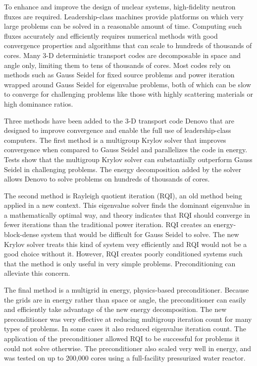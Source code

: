
\noindent       %
To enhance and improve the design of nuclear systems, high-fidelity neutron fluxes are required. Leadership-class machines provide platforms on which very large problems can be solved in a reasonable amount of time. Computing such fluxes accurately and efficiently requires numerical methods with good convergence properties and algorithms that can scale to hundreds of thousands of cores. Many 3-D deterministic transport codes are decomposable in space and angle only, limiting them to tens of thousands of cores. Most codes rely on methods such as Gauss Seidel for fixed source problems and power iteration wrapped around Gauss Seidel for eigenvalue problems, both of which can be slow to converge for challenging problems like those with highly scattering materials or high dominance ratios. 

\vspace*{0.5em}
\noindent       %
Three methods have been added to the 3-D \Sn transport code Denovo that are designed to improve convergence and enable the full use of leadership-class computers. The first method is a multigroup Krylov solver that improves convergence when compared to Gauss Seidel and parallelizes the code in energy. Tests show that the multigroup Krylov solver can substantially outperform Gauss Seidel in challenging problems. The energy decomposition added by the solver allows Denovo to solve problems on hundreds of thousands of cores. 

\vspace*{0.5em}
\noindent       %
The second method is Rayleigh quotient iteration (RQI), an old method being applied in a new context. This eigenvalue solver finds the dominant eigenvalue in a mathematically optimal way, and theory indicates that RQI should converge in fewer iterations than the traditional power iteration. RQI creates an energy-block-dense system that would be difficult for Gauss Seidel to solve. The new Krylov solver treats this kind of system very efficiently and RQI would not be a good choice without it. However, RQI creates poorly conditioned systems such that the method is only useful in very simple problems. Preconditioning can alleviate this concern. 

\vspace*{0.5em}
\noindent       %
The final method is a multigrid in energy, physics-based preconditioner. Because the grids are in energy rather than space or angle, the preconditioner can easily and efficiently take advantage of the new energy decomposition. The new preconditioner was very effective at reducing multigroup iteration count for many types of problems. In some cases it also reduced eigenvalue iteration count. The application of the preconditioner allowed RQI to be successful for problems it could not solve otherwise. The preconditioner also scaled very well in energy, and was tested on up to 200,000 cores using a full-facility pressurized water reactor.

